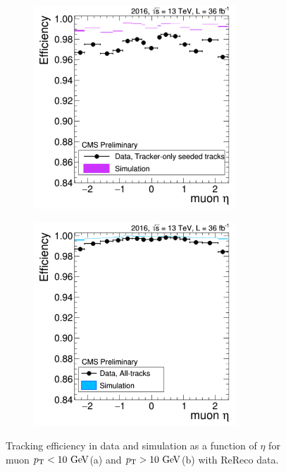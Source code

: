 \begin{figure}[tbh]
\centering
\begin{subfigure}{0.45\textwidth}
\centering
\includegraphics[width=3in]{Figures/Muons/trackingEffptl10.pdf}
\caption{}
\end{subfigure}
\begin{subfigure}{0.45\textwidth}
\centering
\includegraphics[width=3in]{Figures/Muons/trackingEffptg10.pdf}
\caption{}
\end{subfigure}
    \caption{Tracking efficiency in data and simulation as a function of $\eta$ for muon $p_{\rm{T}} < 10\ \mathrm{Ge\kern -0.1em V}$(a) and $p_{\rm{T}} > 10\ \mathrm{Ge\kern -0.1em V}$(b) with ReReco data.}
    \label{fig:MuonIDEff_4}
\end{figure}



